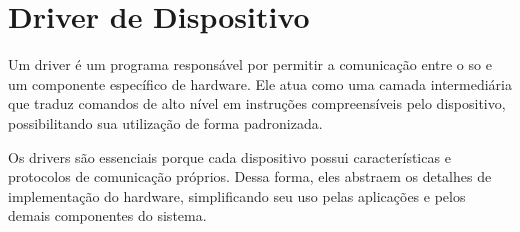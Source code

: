 \section{Driver de Dispositivo}

Um driver é um programa responsável por permitir a comunicação entre o \gls{so} e um componente específico de hardware.
Ele atua como uma camada intermediária que traduz comandos de alto nível em instruções compreensíveis pelo dispositivo, possibilitando sua utilização de forma padronizada.

Os drivers são essenciais porque cada dispositivo possui características e protocolos de comunicação próprios.
Dessa forma, eles abstraem os detalhes de implementação do hardware, simplificando seu uso pelas aplicações e pelos demais componentes do sistema.

